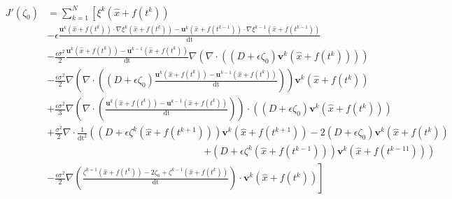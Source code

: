 \documentclass[11pt,a4paper]{article}
\begin{document}
		\begin{equation*}
			\begin{split}
				J'(\zeta_0) &= \sum^{N}_{k=1} \left[ \xi^k(\hat{x} + f(t^k)) \right.\\
				&  - \epsilon \frac{\mathbf{u}^k(\hat{x} + f(t^k)) \cdot \nabla \xi^k(\hat{x} + f(t^{k})) - \mathbf{u}^k(\hat{x} + f(t^{k-1})) \cdot \nabla \xi^{k-1}(\hat{x} + f(t^{k-1}))}{\mathrm{dt}} \\
				&  - \frac{\epsilon \sigma^2}{2}  \frac{\mathbf{u}^k(\hat{x} + f(t^k)) - \mathbf{u}^{k-1}(\hat{x} + f(t^k))}{\mathrm{dt}}  \nabla\left( \nabla \cdot \left( (D + \epsilon \zeta_0) \mathbf{v}^k(\hat{x} + f(t^k)) \right) \right)\\
				&  - \frac{\epsilon \sigma^2}{2} \nabla \left( \nabla \cdot \left((D+\epsilon \zeta_0)\frac{\mathbf{u}^k(\hat{x} + f(t^k)) - \mathbf{u}^{k-1}(\hat{x} + f(t^k))}{\mathrm{dt}}\right) \right)  \mathbf{v}^k(\hat{x} + f(t^k))  \\
				& + \frac{\epsilon \sigma^2}{3} \nabla \left( \nabla \cdot \left( \frac{\mathbf{u}^k(\hat{x} + f(t^k)) - \mathbf{u}^{k-1}(\hat{x} + f(t^k))}{\mathrm{dt}} \right) \right) \cdot \left(  (D + \epsilon \zeta_0) \mathbf{v}^k(\hat{x} + f(t^k)) \right) \\
				&  + \frac{\sigma^2}{2} \nabla \cdot \frac{1}{\mathrm{dt}^2} \left( (D + \epsilon \zeta^k(\hat{x} + f(t^{k+1}))) \mathbf{v}^k(\hat{x} + f(t^{k+1})) -2(D + \epsilon \zeta_0) \mathbf{v}^k(\hat{x} + f(t^{k})) \right. \\
				& \qquad \qquad \qquad \qquad \qquad \qquad \qquad \qquad  \left. + (D + \epsilon \zeta^k(\hat{x} + f(t^{k-1}))) \mathbf{v}^k(\hat{x} + f(t^{k-11}))\right)\\
				& \left. - \frac{\epsilon \sigma^2}{2} \nabla  \left(\frac{\zeta^{k+1}(\hat{x} + f(t^k)) - 2\zeta_0 + \zeta^{k-1}(\hat{x} + f(t^k))}{\mathrm{dt}} \right) \cdot \mathbf{v}^k(\hat{x} + f(t^k)) \right]
			\end{split}
		\end{equation*}
				
		
\end{document}
